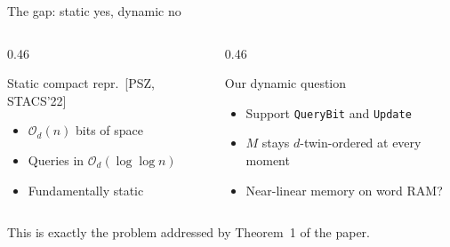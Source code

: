 \documentclass[aspectratio=169,11pt]{beamer}
\newcommand{\Oh}{\mathcal{O}}
\begin{document}
\begin{frame}{The gap: static yes, dynamic no}
\begin{columns}[T]
\begin{column}{0.46\textwidth}
\begin{block}{Static compact repr.\ {\small[PSZ, STACS'22]}}
\begin{itemize}
\item $\Oh_d(n)$ bits of space
\item Queries in $\Oh_d(\log\log n)$
\item Fundamentally static
\end{itemize}
\end{block}
\end{column}
\begin{column}{0.46\textwidth}
\begin{alertblock}{Our dynamic question}
\begin{itemize}
\item Support \texttt{QueryBit} and \texttt{Update}
\item $M$ stays $d$-twin-ordered at every moment
\item Near-linear memory on word RAM?
\end{itemize}
\end{alertblock}
\end{column}
\end{columns}

\bigskip
\centering
{}

\smallskip
{\small This is exactly the problem addressed by Theorem~1 of the paper.}
\end{frame}
\end{document}
